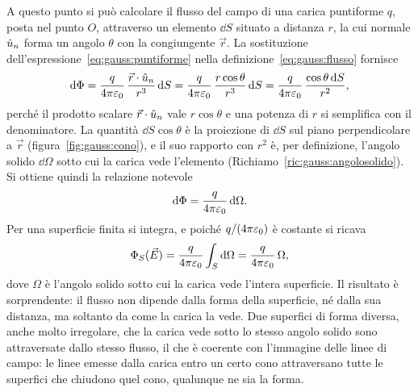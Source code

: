 \documentclass[11pt,a4paper]{article}
\begin{document}
A questo punto si può calcolare il flusso del campo di una carica puntiforme $q$, posta nel punto $O$, attraverso un elemento $\dd S$ situato a distanza $r$, la cui normale $\hat{u}_n$ forma un angolo $\theta$ con la congiungente $\vec{r}$. La sostituzione dell'espressione~\eqref{eq:gauss:puntiforme} nella definizione~\eqref{eq:gauss:flusso} fornisce
\[
\mathrm{d}\Phi=\frac{q}{4\pi\varepsilon_0}\,\frac{\vec{r}\cdot\hat{u}_n}{r^3}\,\mathrm{d} S=\frac{q}{4\pi\varepsilon_0}\,\frac{r\cos\theta}{r^3}\,\mathrm{d} S=\frac{q}{4\pi\varepsilon_0}\,\frac{\cos\theta\,\mathrm{d} S}{r^2},
\]
perché il prodotto scalare $\vec{r}\cdot\hat{u}_n$ vale $r\cos\theta$ e una potenza di $r$ si semplifica con il denominatore. La quantità $\dd S\cos\theta$ è la proiezione di $\dd S$ sul piano perpendicolare a $\vec{r}$ (figura~\ref{fig:gauss:cono}), e il suo rapporto con $r^2$ è, per definizione, l'angolo solido $\dd\Omega$ sotto cui la carica vede l'elemento (Richiamo~\ref{ric:gauss:angolosolido}). Si ottiene quindi la relazione notevole
\begin{equation}
\mathrm{d}\Phi=\frac{q}{4\pi\varepsilon_0}\,\mathrm{d}\Omega .
\label{eq:gauss:dphi}
\end{equation}
Per una superficie finita si integra, e poiché $q/(4\pi\varepsilon_0)$ è costante si ricava
\[
\Phi_S(\vec{E})=\frac{q}{4\pi\varepsilon_0}\int_S\mathrm{d}\Omega=\frac{q}{4\pi\varepsilon_0}\,\Omega ,
\]
dove $\Omega$ è l'angolo solido sotto cui la carica vede l'intera superficie. Il risultato è sorprendente: il flusso non dipende dalla forma della superficie, né dalla sua distanza, ma soltanto da come la carica la vede. Due superfici di forma diversa, anche molto irregolare, che la carica vede sotto lo stesso angolo solido sono attraversate dallo stesso flusso, il che è coerente con l'immagine delle linee di campo: le linee emesse dalla carica entro un certo cono attraversano tutte le superfici che chiudono quel cono, qualunque ne sia la forma.
\end{document}
